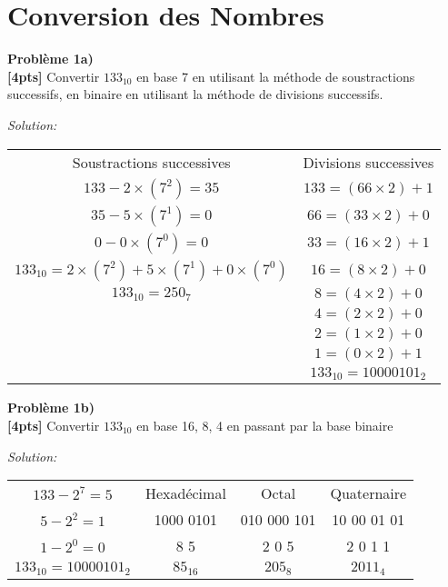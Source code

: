 \documentclass{article}
\newenvironment{problem}[2][Problème]
    { \begin{mdframed}[backgroundcolor=gray!20] \textbf{#1 #2} \\}
    {  \end{mdframed}}
\newenvironment{solution}
    {\textit{Solution:}}
    {}
\begin{document}
\section{Conversion des Nombres}

\begin{problem}{1a)}
\textbf{[4pts]} Convertir $133_{10}$ en base 7 en utilisant la méthode de soustractions successifs, en binaire en utilisant la méthode de divisions successifs.
\end{problem}
\begin{solution}
    \begin{tabular}{c|c}
        Soustractions successives & Divisions successives\\
        $133 - 2\times(7^2) = 35$ & $133 = (66\times2)+1$\\
        $35 - 5\times(7^1) = 0$ & $66 = (33\times2)+0$\\
        $0 - 0\times(7^0) = 0$ & $33 = (16\times2) +1$\\
        $133_{10} = 2\times(7^2) + 5\times(7^1) + 0\times(7^0)$ & $16 = (8\times2) +0$\\
        $133_{10} = 250_7$ & $8 = (4\times2) +0$\\
        & $4=(2\times2)+0$\\
        & $2 = (1\times2)+0$\\
        & $1= (0\times2) +1$\\
        & $133_10 = 10000101_2$ 
    \end{tabular}
\end{solution}

\begin{problem}{1b)}
\textbf{[4pts]} Convertir $133_{10}$ en base 16, 8, 4 en passant par la base binaire
\end{problem}
\begin{solution}
    \begin{tabular}{cc|c|c}
    $133-2^7=5$ & Hexadécimal & Octal & Quaternaire\\
    $5-2^2 = 1$ & 1000 0101 & 010 000 101 & 10 00 01 01\\
    $1-2^0 = 0$ & 8 \hspace{14pt} 5 & 2 \hspace{6pt} 0 \hspace{6pt} 5 & 2 \hspace{4pt}0 \hspace{4pt}1 \hspace{4pt}1\\
    $133_{10} = 1000 0101_2$ & $85_{16}$ & $205_8$ & $2011_4$
    \end{tabular}
\end{solution}
\end{document}
